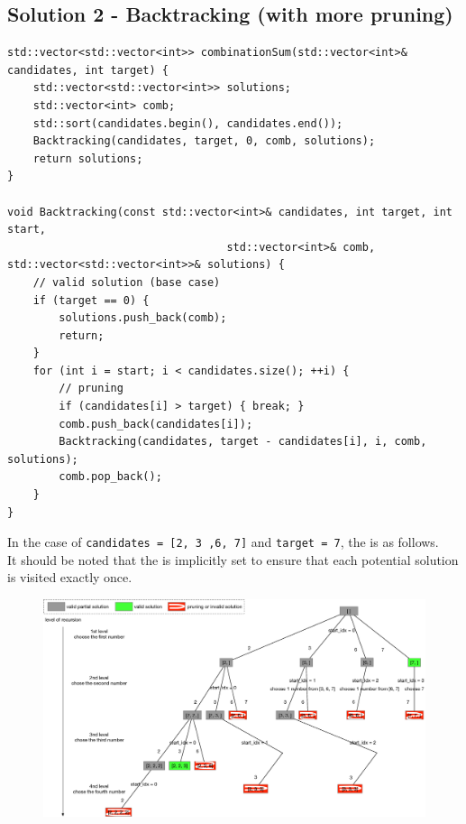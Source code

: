 \subsection*{Solution 2 - Backtracking (with more pruning)}
\begin{lstlisting}
std::vector<std::vector<int>> combinationSum(std::vector<int>& candidates, int target) {
	std::vector<std::vector<int>> solutions;
	std::vector<int> comb;
	std::sort(candidates.begin(), candidates.end());
	Backtracking(candidates, target, 0, comb, solutions);
	return solutions;
}

void Backtracking(const std::vector<int>& candidates, int target, int start, 
								  std::vector<int>& comb, std::vector<std::vector<int>>& solutions) {
	// valid solution (base case)
	if (target == 0) {
		solutions.push_back(comb);
		return;
	}
	for (int i = start; i < candidates.size(); ++i) {
		// pruning
		if (candidates[i] > target) { break; }
		comb.push_back(candidates[i]);
		Backtracking(candidates, target - candidates[i], i, comb, solutions);
		comb.pop_back();
	}
}
\end{lstlisting}\mbox{}

In the case of {\colorbox{CodeBackground}{\lstinline|candidates = [2, 3 ,6, 7]|}} and {\colorbox{CodeBackground}{\lstinline|target = 7|}}, the {\color{blue}{potential search tree}} is as follows. \\

It should be noted that the {\color{blue}{search order}} is implicitly set to ensure that each potential solution is visited exactly once.

\begin{figure}[H]
	\centering
	\includegraphics[width=1.0\linewidth]{images/lc0039_pst_2}
	\label{fig:lc0039pst2}
\end{figure}

